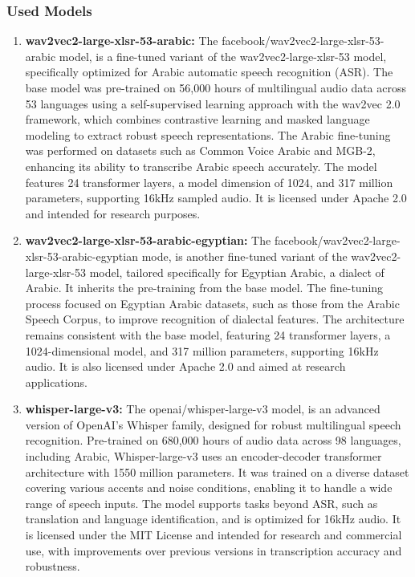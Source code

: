 \documentclass[12pt]{article}
\begin{document}
\subsubsection{Used Models}
\begin{enumerate}
    \item \textbf{wav2vec2-large-xlsr-53-arabic:} The facebook/wav2vec2-large-xlsr-53-arabic model, is a fine-tuned variant of the wav2vec2-large-xlsr-53 model, specifically optimized for Arabic automatic speech recognition (ASR). The base model was pre-trained on 56,000 hours of multilingual audio data across 53 languages using a self-supervised learning approach with the wav2vec 2.0 framework, which combines contrastive learning and masked language modeling to extract robust speech representations. The Arabic fine-tuning was performed on datasets such as Common Voice Arabic and MGB-2, enhancing its ability to transcribe Arabic speech accurately. The model features 24 transformer layers, a model dimension of 1024, and 317 million parameters, supporting 16kHz sampled audio. It is licensed under Apache 2.0 and intended for research purposes.
    

    \item \textbf{wav2vec2-large-xlsr-53-arabic-egyptian:} The facebook/wav2vec2-large-xlsr-53-arabic-egyptian mode, is another fine-tuned variant of the wav2vec2-large-xlsr-53 model, tailored specifically for Egyptian Arabic, a dialect of Arabic. It inherits the pre-training from the base model. The fine-tuning process focused on Egyptian Arabic datasets, such as those from the Arabic Speech Corpus, to improve recognition of dialectal features. The architecture remains consistent with the base model, featuring 24 transformer layers, a 1024-dimensional model, and 317 million parameters, supporting 16kHz audio. It is also licensed under Apache 2.0 and aimed at research applications.

    \item \textbf{whisper-large-v3:} The openai/whisper-large-v3 model, is an advanced version of OpenAI’s Whisper family, designed for robust multilingual speech recognition. Pre-trained on 680,000 hours of audio data across 98 languages, including Arabic, Whisper-large-v3 uses an encoder-decoder transformer architecture with 1550 million parameters. It was trained on a diverse dataset covering various accents and noise conditions, enabling it to handle a wide range of speech inputs. The model supports tasks beyond ASR, such as translation and language identification, and is optimized for 16kHz audio. It is licensed under the MIT License and intended for research and commercial use, with improvements over previous versions in transcription accuracy and robustness.


\end{enumerate}
\end{document}
